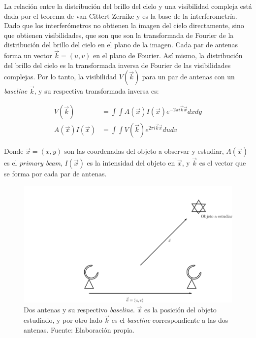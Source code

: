 La relación entre la distribución del brillo del cielo y una visibilidad compleja está dada por el teorema de van Cittert-Zernike \citep{zernike} y es la base de la interferometría. Dado que los interferómetros no obtienen la imagen del cielo directamente, sino que obtienen visibilidades, que son que son la transformada de Fourier de la distribución del brillo del cielo en el plano de la imagen. Cada par de antenas forma un vector $\vec{k} = (u,v)$ en el plano de Fourier. Así mismo, la distribución del brillo del cielo es la transformada inversa de Fourier de las visibilidades complejas. Por lo tanto, la visibilidad $V(\vec{k})$ para un par de antenas con un \textit{baseline} $\vec{k}$, y su respectiva transformada inversa es:


\begin{align}
V(\vec{k}) &= \int\int A(\vec{x})I(\vec{x})e^{-2\pi i\vec{k}\vec{x}}dxdy \\
A(\vec{x})I(\vec{x}) &= \int\int V(\vec{k})e^{2\pi i\vec{k}\vec{x}}dudv
\end{align}

Donde $\vec{x} = (x,y)$ son las coordenadas del objeto a observar y estudiar, $A(\vec{x})$ es el \textit{primary beam}, $I(\vec{x})$ es la intensidad del objeto en $\vec{x}$, y $\vec{k}$ es el vector que se forma por cada par de antenas.

\begin{figure}[h!]
\centering
\includegraphics[scale=0.4]{images/antenas.png}
\caption{Dos antenas y su respectivo \textit{baseline}. $\vec{x}$ es la posición del objeto estudiado, y por otro lado $\vec{k}$ es el \textit{baseline} correspondiente a las dos antenas. Fuente: Elaboración propia.}
\label{fig:antena}
\end{figure}

